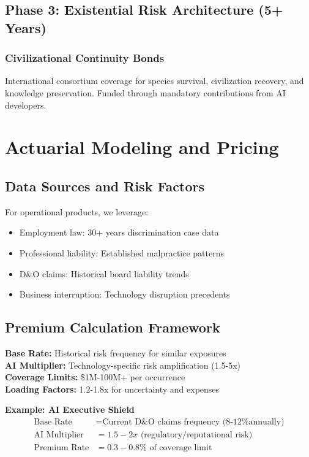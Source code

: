 \documentclass[11pt]{article}
\begin{document}
\subsection{Phase 3: Existential Risk Architecture (5+ Years)}

\subsubsection{Civilizational Continuity Bonds}
International consortium coverage for species survival, civilization recovery, and knowledge preservation. Funded through mandatory contributions from AI developers.

\section{Actuarial Modeling and Pricing}

\subsection{Data Sources and Risk Factors}

For operational products, we leverage:
\begin{itemize}
   \item Employment law: 30+ years discrimination case data
   \item Professional liability: Established malpractice patterns  
   \item D\&O claims: Historical board liability trends
   \item Business interruption: Technology disruption precedents
\end{itemize}

\subsection{Premium Calculation Framework}

\textbf{Base Rate:} Historical risk frequency for similar exposures\\
\textbf{AI Multiplier:} Technology-specific risk amplification (1.5-5x)\\
\textbf{Coverage Limits:} \$1M-100M+ per occurrence\\
\textbf{Loading Factors:} 1.2-1.8x for uncertainty and expenses

\textbf{Example: AI Executive Shield}
\begin{align}
\text{Base Rate} &= \text{Current D\&O claims frequency (8-12\% annually)}\\
\text{AI Multiplier} &= 1.5-2x \text{ (regulatory/reputational risk)}\\
\text{Premium Rate} &= 0.3-0.8\% \text{ of coverage limit}
\end{align}
\end{document}
